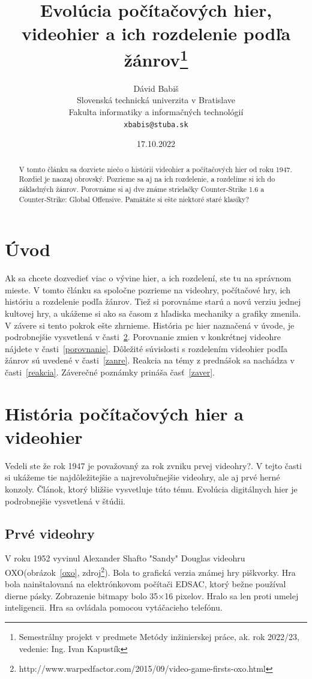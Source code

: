 \documentclass[10pt,oneside,slovak,a4paper]{article}
\title{Evolúcia počítačových hier, videohier a ich rozdelenie podľa žánrov\thanks{Semestrálny projekt v predmete Metódy inžinierskej práce, ak. rok 2022/23, vedenie: Ing. Ivan Kapustík}} %
\author{Dávid Babiš\\[2pt]
	{\small Slovenská technická univerzita v Bratislave}\\
	{\small Fakulta informatiky a informačných technológií}\\
	{\small \texttt{xbabis@stuba.sk}}
	}
\date{\small 17.10.2022}
\begin{document}
\maketitle

\begin{abstract}
 V tomto článku sa dozviete niečo o histórii videohier a počítačových hier od roku 1947. Rozdiel je naozaj obrovský. Pozrieme sa aj na ich rozdelenie, a rozdelíme si ich do základných žánrov. Porovnáme si aj dve známe strielačky Counter-Strike 1.6 a Counter-Strike: Global Offensive. Pamätáte si ešte niektoré staré klasiky?
\end{abstract}



\section{Úvod}
Ak sa chcete dozvedieť viac o vývine hier, a ich rozdelení, ste tu na správnom mieste. V tomto článku sa spoločne pozrieme na videohry, počítačové hry, ich históriu a rozdelenie podľa žánrov. Tiež si porovnáme starú a novú verziu jednej kultovej hry, a ukážeme si ako sa časom z hľadiska mechaniky a grafiky zmenila. V závere si tento pokrok ešte zhrnieme. História pc hier naznačená v úvode, je podrobnejšie vysvetlená v časti~\ref{historia}. Porovnanie zmien v konkrétnej videohre nájdete v časti~\ref{porovnanie}. 
Dôležité súvislosti s rozdelením videohier podľa žánrov sú uvedené v časti~\ref{zanre}. Reakcia na témy z prednášok sa nachádza v časti~\ref{reakcia}. 
Záverečné poznámky prináša časť~\ref{zaver}.

\pagebreak

\section{História počítačových hier a videohier} \label{historia}
Vedeli ste že rok 1947 je považovaný za rok zvniku prvej videohry?. V tejto časti si ukážeme tie najdôležitejšie a najrevolučnejšie videohry, ale aj prvé herné konzoly. Článok, ktorý bližšie vysvetluje túto tému\cite{Lowood}. Evolúcia digitálnych hier je podrobnejšie vysvetlená v štúdii\cite{sahay}.

\subsection{Prvé videohry}

V roku 1952 vyvinul Alexander Shafto "Sandy" Douglas videohru OXO(obrázok~\ref{oxo}, zdroj\footnote{http://www.warpedfactor.com/2015/09/video-game-firsts-oxo.html}). Bola to grafická verzia známej hry piškvorky. Hra bola nainštalovaná na elektrónkovom počítači EDSAC, ktorý bežne používal dierne pásky. Zobrazenie bitmapy bolo 35×16 pixelov. Hralo sa len proti umelej inteligencii. Hra sa ovládala pomocou vytáčacieho telefónu.
\end{document}
